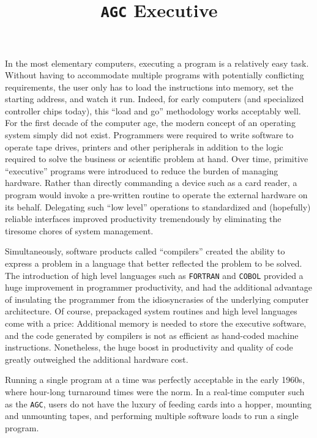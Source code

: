 \documentclass[refcap, oxford]{ahsan}
\title{\texttt{AGC} Executive}
\author{}
\begin{document}
\maketitle
\iffalse

\ifextraC
In the most elementary computers, executing a program is a relatively easy task. Without having to accommodate multiple programs with potentially conflicting requirements, the user only has to load the instructions into memory, set the starting address, and watch it run. Indeed, for early computers (and specialized controller chips today), this ``load and go'' methodology works acceptably well. For the first decade of the computer age, the modern concept of an operating system simply did not exist. Programmers were required to write software to operate tape drives, printers and other peripherals in addition to the logic required to solve the business or scientific problem at hand. Over time, primitive ``executive'' programs were introduced to reduce the burden of managing hardware. Rather than directly commanding a device such as a card reader, a program would invoke a pre-written routine to operate the external hardware on its behalf. Delegating such ``low level'' operations to standardized and (hopefully) reliable interfaces improved productivity tremendously by eliminating the tiresome chores of system management.

Simultaneously, software products called ``compilers'' created the ability to express a problem in a language that better reflected the problem to be solved. The introduction of high level languages such as \texttt{FORTRAN} and \texttt{COBOL} provided a huge improvement in programmer productivity, and had the additional advantage of insulating the programmer from the idiosyncrasies of the underlying computer architecture. Of course, prepackaged system routines and high level languages come with a price: Additional memory is needed to store the executive software, and the code generated by compilers is not as efficient as hand-coded machine instructions. Nonetheless, the huge boost in productivity and quality of code greatly outweighed the additional hardware cost.

Running a single program at a time was perfectly acceptable in the early 1960s, where hour-long turnaround times were the norm. In a real-time computer such as the \texttt{AGC}, users do not have the luxury of feeding cards into a hopper, mounting and unmounting tapes, and performing multiple software loads to run a single program.
\end{document}
